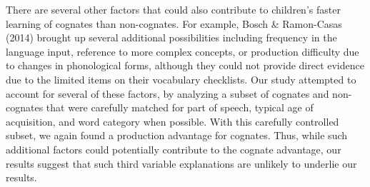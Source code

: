 \documentclass[
  ,man,floatsintext]{apa6}
\begin{document}
There are several other factors that could also contribute to children's faster learning of cognates than non-cognates. For example, Bosch \& Ramon-Casas (2014) brought up several additional possibilities including frequency in the language input, reference to more complex concepts, or production difficulty due to changes in phonological forms, although they could not provide direct evidence due to the limited items on their vocabulary checklists. Our study attempted to account for several of these factors, by analyzing a subset of cognates and non-cognates that were carefully matched for part of speech, typical age of acquisition, and word category when possible. With this carefully controlled subset, we again found a production advantage for cognates. Thus, while such additional factors could potentially contribute to the cognate advantage, our results suggest that such third variable explanations are unlikely to underlie our results.
\end{document}
